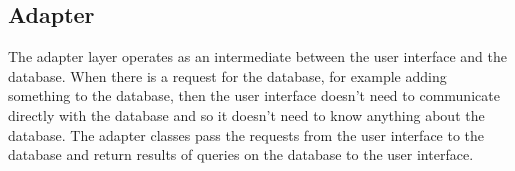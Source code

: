 
\subsection{Adapter}
The adapter layer operates as an intermediate between the user interface and the database. When there is a request for the database, for example adding something to the database, then the user interface doesn't need to communicate directly with the database and so it doesn't need to know anything about the database. The adapter classes pass the requests from the user interface to the database and return results of queries on the database to the user interface.